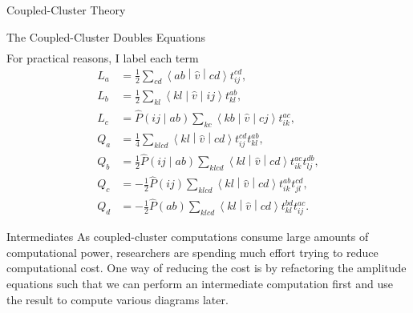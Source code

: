 \documentclass[twoside,english]{uiofysmaster}
\begin{document}
\begin{chapter}{Coupled-Cluster Theory}
\begin{section}{The Coupled-Cluster Doubles Equations}
\begin{align}
  		\end{align}
  		For practical reasons, I label each term
  		\begin{align}
  			L_a &= \frac{1}{2} \sum_{cd}\left<ab\middle|\hat v\middle|cd\right>t_{ij}^{cd}, \\
  			L_b &= \frac{1}{2} \sum_{kl} \left<kl\middle|\hat v\middle|ij\right>t_{kl}^{ab}, \\
  			L_c &= \hat P\left(ij\middle|ab\right) \sum_{kc}\left<kb\middle|\hat v\middle|cj\right>t_{ik}^{ac}, \\
  			Q_a &= \frac{1}{4} \sum_{klcd}\left<kl\middle|\hat v\middle|cd\right>t_{ij}^{cd} t_{kl}^{ab}, \\
  			Q_b &= \frac{1}{2} \hat P\left(ij\middle|ab\right) \sum_{klcd}\left<kl\middle|\hat v\middle|cd\right>t_{ik}^{ac} t_{lj}^{db}, \\
  			Q_c &= - \frac{1}{2}\hat P(ij) \sum_{klcd}\left<kl\middle|\hat v\middle|cd\right>t_{ik}^{ab} t_{jl}^{cd}, \\
  			Q_d &= - \frac{1}{2}\hat P(ab) \sum_{klcd}\left<kl\middle|\hat v\middle|cd\right>t_{kl}^{bd} t_{ij}^{ac}.
  		\end{align}
   	\end{section}
  	\begin{section}{Intermediates}
  		As coupled-cluster computations consume large amounts of computational power, researchers are spending much effort trying to reduce computational cost. One way of reducing the cost is by refactoring the amplitude equations such that we can perform an intermediate computation first and use the result to compute various diagrams later. 


\end{section}
\end{chapter}
\end{document}
